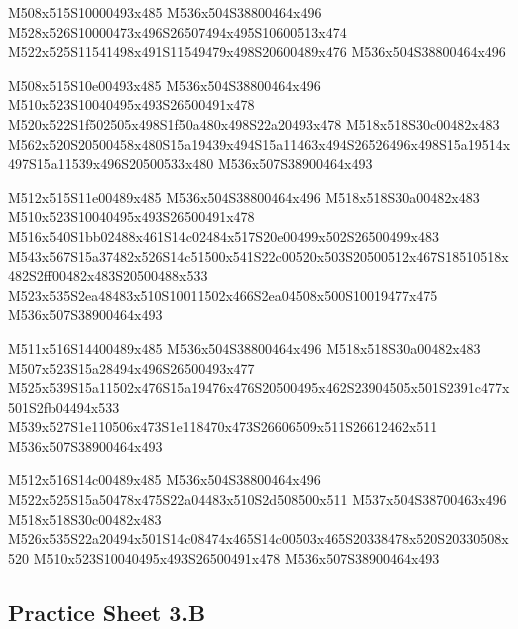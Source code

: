 \documentclass{article}
\begin{document}
\begin{multicols}{5}
\begin{center}

M508x515S10000493x485 %
M536x504S38800464x496 %
M528x526S10000473x496S26507494x495S10600513x474 %
M522x525S11541498x491S11549479x498S20600489x476 %
M536x504S38800464x496 %
\vfil
\columnbreak

M508x515S10e00493x485 %
M536x504S38800464x496 %
M510x523S10040495x493S26500491x478 %
M520x522S1f502505x498S1f50a480x498S22a20493x478 %
M518x518S30c00482x483 %
M562x520S20500458x480S15a19439x494S15a11463x494S26526496x498S15a19514x497S15a11539x496S20500533x480 %
M536x507S38900464x493 %
\vfil
\columnbreak

M512x515S11e00489x485 %
M536x504S38800464x496 %
M518x518S30a00482x483 %
M510x523S10040495x493S26500491x478 %
M516x540S1bb02488x461S14c02484x517S20e00499x502S26500499x483 %
M543x567S15a37482x526S14c51500x541S22c00520x503S20500512x467S18510518x482S2ff00482x483S20500488x533 %
M523x535S2ea48483x510S10011502x466S2ea04508x500S10019477x475 %
M536x507S38900464x493 %
\vfil
\columnbreak

M511x516S14400489x485 %
M536x504S38800464x496 %
M518x518S30a00482x483 %
M507x523S15a28494x496S26500493x477 %
M525x539S15a11502x476S15a19476x476S20500495x462S23904505x501S2391c477x501S2fb04494x533 %
M539x527S1e110506x473S1e118470x473S26606509x511S26612462x511 %
M536x507S38900464x493 %
\vfil
\columnbreak

M512x516S14c00489x485 %
M536x504S38800464x496 %
M522x525S15a50478x475S22a04483x510S2d508500x511 %
M537x504S38700463x496 %
M518x518S30c00482x483 %
M526x535S22a20494x501S14c08474x465S14c00503x465S20338478x520S20330508x520 %
M510x523S10040495x493S26500491x478 %
M536x507S38900464x493 %
\vfil

\end{center}
\end{multicols}

\subsection{Practice Sheet 3.B}
\end{document}

